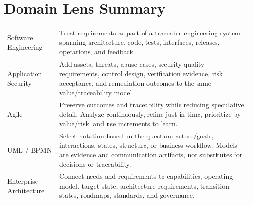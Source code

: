 \documentclass[11pt]{article}
\begin{document}
\section{Domain Lens Summary}
\begin{longtable}{L{0.18\textwidth} L{0.70\textwidth}}
\toprule
Software Engineering & Treat requirements as part of a traceable engineering system spanning architecture, code, tests, interfaces, releases, operations, and feedback.\\
Application Security & Add assets, threats, abuse cases, security quality requirements, control design, verification evidence, risk acceptance, and remediation outcomes to the same value/traceability model.\\
Agile & Preserve outcomes and traceability while reducing speculative detail. Analyze continuously, refine just in time, prioritize by value/risk, and use increments to learn.\\
UML / BPMN & Select notation based on the question: actors/goals, interactions, states, structure, or business workflow. Models are evidence and communication artifacts, not substitutes for decisions or traceability.\\
Enterprise Architecture & Connect needs and requirements to capabilities, operating model, target state, architecture requirements, transition states, roadmaps, standards, and governance.\\
\bottomrule
\end{longtable}
\end{document}
